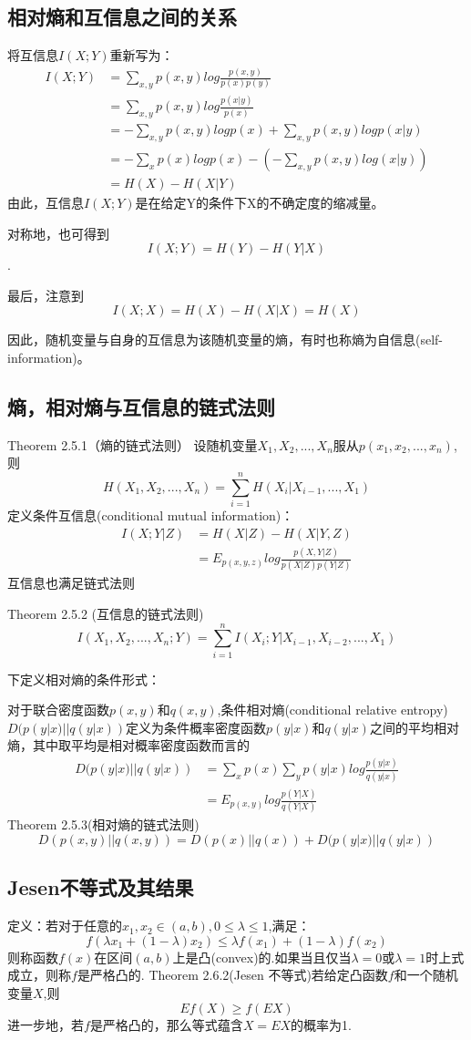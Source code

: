 \documentclass{article}
\begin{document}
\subsection{相对熵和互信息之间的关系}

将互信息$I(X;Y)$重新写为：
\begin{align}
    I(X;Y)&=\sum_{x,y}p(x,y)log\frac{p(x,y)}{p(x)p(y)}\\
          &=\sum_{x,y}p(x,y)log\frac{p(x|y)}{p(x)}\\
          &=-\sum_{x,y}p(x,y)logp(x)+\sum_{x,y}p(x,y)logp(x|y)\\
          &=-\sum_{x}p(x)logp(x)-(-\sum_{x,y}p(x,y)log(x|y))\\
          &=H(X)-H(X|Y)
\end{align}
由此，互信息$I(X;Y)$是在给定Y的条件下X的不确定度的缩减量。

对称地，也可得到\[I(X;Y)=H(Y)-H(Y|X)\].

最后，注意到\[I(X;X)=H(X)-H(X|X)=H(X)\]

因此，随机变量与自身的互信息为该随机变量的熵，有时也称熵为自信息(self-information)。
\subsection{熵，相对熵与互信息的链式法则}
Theorem 2.5.1（熵的链式法则）
设随机变量$X_1,X_2,...,X_n$服从$p(x_1,x_2,...,x_n)$,则\[H(X_1,X_2,...,X_n)=\sum_{i=1}^{n}H(X_i|X_{i-1},...,X_1)\]
定义条件互信息(conditional mutual information)：
\begin{align}
    I(X;Y|Z)&=H(X|Z)-H(X|Y,Z)\\
            &=E_{p(x,y,z)}log\frac{p(X,Y|Z)}{p(X|Z)p(Y|Z)}
\end{align}
互信息也满足链式法则

Theorem 2.5.2 (互信息的链式法则)\[I(X_1,X_2,...,X_n;Y)=\sum_{i=1}^{n}I(X_i;Y|X_{i-1},X_{i-2},...,X_1)\]

下定义相对熵的条件形式：

对于联合密度函数$p(x,y)$和$q(x,y)$,条件相对熵(conditional relative entropy)$D(p(y|x)||q(y|x))$定义为条件概率密度函数$p(y|x)$和$q(y|x)$之间的平均相对熵，其中取平均是相对概率密度函数而言的
\begin{align}
    D(p(y|x)||q(y|x))&=\sum_{x}p(x)\sum_{y}p(y|x)log\frac{p(y|x)}{q(y|x)}\\
                     &=E_{p(x,y)}log\frac{p(Y|X)}{q(Y|X)}
\end{align}
Theorem 2.5.3(相对熵的链式法则)\[D(p(x,y)||q(x,y))=D(p(x)||q(x))+D(p(y|x)||q(y|x))\]
\subsection{Jesen不等式及其结果}
定义：若对于任意的$x_1,x_2 \in (a,b),0\leq \lambda \leq 1$,满足：\[f(\lambda x_1+(1-\lambda)x_2)\leq \lambda f(x_1)+(1-\lambda)f(x_2)\]则称函数$f(x)$在区间$(a,b)$上是凸(convex)的.如果当且仅当$\lambda =0$或$\lambda =1$时上式成立，则称$f$是严格凸的.
Theorem 2.6.2(Jesen 不等式)若给定凸函数$f$和一个随机变量$X$,则\[Ef(X)\geq f(EX)\]进一步地，若$f$是严格凸的，那么等式蕴含$X=EX$的概率为1.
\end{document}
